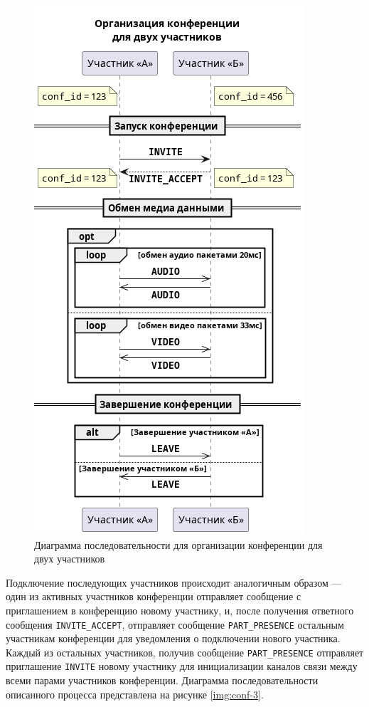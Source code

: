 \begin{figure}[H]
  \centering
  \includegraphics[width=0.6\linewidth]{inc/diag/seq-2/conf-2.png}
  \caption{Диаграмма последовательности для организации конференции для двух участников}
  \label{img:conf-2}
\end{figure}

Подключение последующих участников происходит аналогичным образом --- один из активных участников конференции отправляет сообщение с приглашением в конференцию новому участнику, и, после получения ответного сообщения \texttt{INVITE\_ACCEPT}, отправляет сообщение \texttt{PART\_PRESENCE} остальным участникам конференции для уведомления о подключении нового участника.
Каждый из остальных участников, получив сообщение \texttt{PART\_PRESENCE} отправляет приглашение \texttt{INVITE} новому участнику для инициализации каналов связи между всеми парами участников конференции.
Диаграмма последовательности описанного процесса представлена на рисунке \ref{img:conf-3}.

